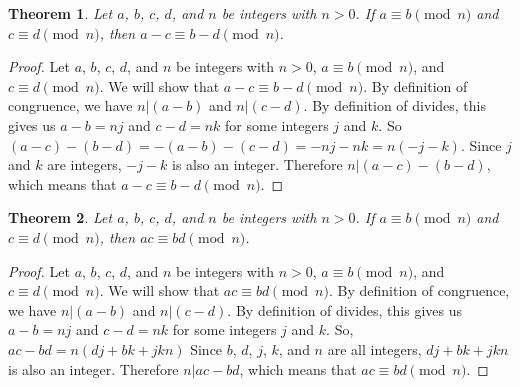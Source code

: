 \documentclass[12pt,leqno]{article}
\numberwithin{equation}{section}
\newtheorem{thm}{Theorem}[section]
\theoremstyle{definition}
\begin{document}
\begin{thm}
Let $a$, $b$, $c$, $d$, and $n$ be integers with $n > 0$. If $a
\equiv b \pmod{n}$ and~${c \equiv d \pmod{n}}$, then $a - c \equiv b
- d \pmod{n}$.
\end{thm}

\begin{proof}[Proof]
Let $a$, $b$, $c$, $d$, and $n$ be integers with $n > 0$, $a
\equiv b \pmod{n}$, and ${c \equiv d \pmod{n}}$. We will show that $a - c \equiv b - d \pmod{n}$.  By definition of congruence, we have $n|(a - b)$ and $n|(c - d)$.  By definition of divides, this gives us $a - b = nj$ and $c - d = nk$ for some integers $j$ and $k$.  So $(a - c) - (b - d) = -(a - b) - (c - d) = -nj - nk = n(-j - k)$.  Since $j$ and $k$ are integers, $-j - k$ is also an integer.  Therefore $n|(a - c) - (b - d)$, which means that $a - c \equiv b - d \pmod{n}$.
\end{proof}

\begin{thm}
Let $a$, $b$, $c$, $d$, and $n$ be integers
with $n > 0$. If $a \equiv b \pmod{n}$ and~${c \equiv d \pmod{n}}$, then
$ac \equiv bd \pmod{n}$.
\end{thm}

\begin{proof}[Proof]
Let $a$, $b$, $c$, $d$, and $n$ be integers with $n > 0$, $a
\equiv b \pmod{n}$, and ${c \equiv d \pmod{n}}$. We will show that $ac \equiv bd \pmod{n}$.  By definition of congruence, we have $n|(a - b)$ and $n|(c - d)$.  By definition of divides, this gives us $a - b = nj$ and $c - d = nk$ for some integers $j$ and $k$. So, $ac - bd = n(dj + bk + jkn)$ Since $b$, $d$, $j$, $k$, and $n$ are all integers, $dj + bk + jkn$ is also an integer.  Therefore $n|ac - bd$, which means that $ac \equiv bd \pmod{n}$.\end{proof}
\end{document}

